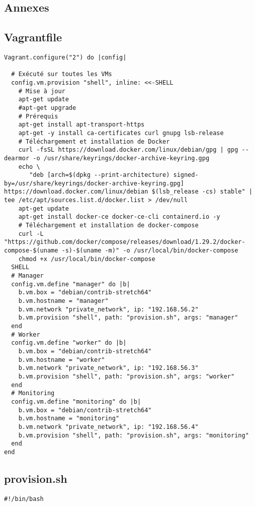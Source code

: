 \documentclass[oneside,12pt]{report}
\begin{document}
\begin{flushleft}
\chapter{Annexes}
\section{Vagrantfile}
\begin{lstlisting}
Vagrant.configure("2") do |config|

  # Exécuté sur toutes les VMs
  config.vm.provision "shell", inline: <<-SHELL
    # Mise à jour
    apt-get update
    #apt-get upgrade
    # Prérequis
    apt-get install apt-transport-https
    apt-get -y install ca-certificates curl gnupg lsb-release
    # Téléchargement et installation de Docker
    curl -fsSL https://download.docker.com/linux/debian/gpg | gpg --dearmor -o /usr/share/keyrings/docker-archive-keyring.gpg
    echo \
       "deb [arch=$(dpkg --print-architecture) signed-by=/usr/share/keyrings/docker-archive-keyring.gpg] https://download.docker.com/linux/debian $(lsb_release -cs) stable" | tee /etc/apt/sources.list.d/docker.list > /dev/null
    apt-get update
    apt-get install docker-ce docker-ce-cli containerd.io -y
    # Téléchargement et installation de docker-compose
    curl -L "https://github.com/docker/compose/releases/download/1.29.2/docker-compose-$(uname -s)-$(uname -m)" -o /usr/local/bin/docker-compose
    chmod +x /usr/local/bin/docker-compose
  SHELL
  # Manager
  config.vm.define "manager" do |b|
    b.vm.box = "debian/contrib-stretch64"
    b.vm.hostname = "manager"
    b.vm.network "private_network", ip: "192.168.56.2"
    b.vm.provision "shell", path: "provision.sh", args: "manager"
  end
  # Worker
  config.vm.define "worker" do |b|
    b.vm.box = "debian/contrib-stretch64"
    b.vm.hostname = "worker"
    b.vm.network "private_network", ip: "192.168.56.3"
    b.vm.provision "shell", path: "provision.sh", args: "worker"
  end
  # Monitoring
  config.vm.define "monitoring" do |b|
    b.vm.box = "debian/contrib-stretch64"
    b.vm.hostname = "monitoring"
    b.vm.network "private_network", ip: "192.168.56.4"
    b.vm.provision "shell", path: "provision.sh", args: "monitoring"
  end
end
\end{lstlisting}

\section{provision.sh}
\begin{lstlisting}
#!/bin/bash


\end{lstlisting}
\end{flushleft}
\end{document}
